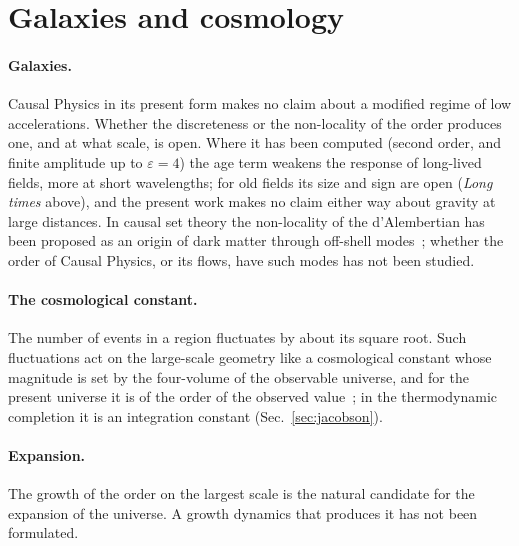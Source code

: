 \section{Galaxies and cosmology}\label{sec:astro-cosmo}

\paragraph{Galaxies.} Causal Physics in its present form makes no claim about a modified regime of low
accelerations. Whether the discreteness or the non-locality of the order produces one, and at what
scale, is open. Where it has been computed (second order, and finite amplitude up to $\varepsilon=4$) the age
term weakens the response of long-lived fields, more at short wavelengths; for old fields its size and sign are
open (\emph{Long times} above), and the present work makes no claim either way about gravity at large distances. In causal set theory the non-locality of the d'Alembertian has been
proposed as an origin of dark matter through off-shell modes~\cite{SaravaniAslanbeigi2015}; whether the
order of Causal Physics, or its flows, have such modes has not been studied. 

\paragraph{The cosmological constant.} The number of events in a region fluctuates by about its square
root. Such fluctuations act on the large-scale geometry like a cosmological constant whose magnitude is
set by the four-volume of the observable universe, and for the present universe it is of the order of
the observed value~\cite{Ahmed2004}; in the thermodynamic completion it is an integration constant
(Sec.~\ref{sec:jacobson}). 

\paragraph{Expansion.} The growth of the order on the largest scale is the natural candidate for the
expansion of the universe. A growth dynamics that produces it has not been formulated.
